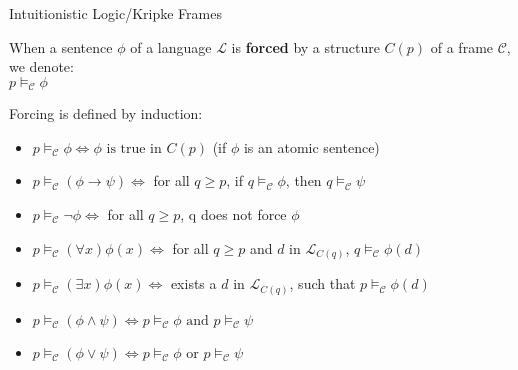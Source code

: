 \documentclass{beamer}
\begin{document}
\begin{frame}{Intuitionistic Logic/Kripke Frames}
\begin{itemize}

    \normalsize{
     \item When a sentence $\phi$ of a language $\mathcal{L}$ is \textbf{forced} by a structure $C(p)$ of a frame $\mathcal{C}$, we denote:\\
    $ p \vDash_{\mathcal{C}} \phi$}
    \item Forcing is defined by induction:


\scriptsize{
    \begin{itemize}
        \item    $ p \vDash_{\mathcal{C}} \phi                 \Leftrightarrow \phi \text{ is true in } C(p)$ (if $\phi$ is an atomic sentence)\\
        \item    $ p \vDash_{\mathcal{C}} (\phi \to \psi)      \Leftrightarrow$   for all $q \geq p$, if $q \vDash_{\mathcal{C}} \phi$, then $q \vDash_{\mathcal{C}} \psi$
        \item    $ p \vDash_{\mathcal{C}} \neg \phi            \Leftrightarrow $  for all $q \geq p$, q does not force $\phi$\\
        \item    $ p \vDash_{\mathcal{C}} (\forall x) \phi(x)  \Leftrightarrow $  for all $q \geq p$ and $d$ in $\mathcal{L}_{C(q)}$, $q \vDash_{\mathcal{C}} \phi(d)$ \\
        \item    $ p \vDash_{\mathcal{C}} (\exists x) \phi(x)  \Leftrightarrow $  exists a $d$ in  $\mathcal{L}_{C(q)}$, such that $p \vDash_{\mathcal{C}} \phi(d)$\\
        \item    $ p \vDash_{\mathcal{C}} (\phi \land \psi)    \Leftrightarrow p \vDash_{\mathcal{C}} \phi \text{ and } p \vDash_{\mathcal{C}} \psi$ \\
        \item    $ p \vDash_{\mathcal{C}} (\phi \lor \psi)     \Leftrightarrow p \vDash_{\mathcal{C}} \phi$ or $p \vDash_{\mathcal{C}} \psi$ \\
    
    
    \end{itemize}
}

\end{itemize}

\end{frame}
\end{document}
